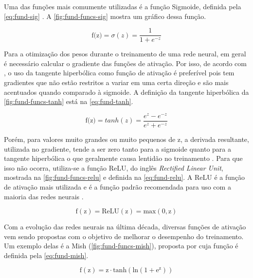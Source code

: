 Uma das funções mais comumente utilizadas é a função Sigmoide, definida pela \autoref{eq:fund-sig} \cite{ref:Sharma}. A \autoref{fig:fund-funcs-sig} mostra um gráfico dessa função.

\begin{equation} \label{eq:fund-sig}
  \text{f(z)} = \sigma(z) = \frac{1}{1 + e^{-z}}
\end{equation}

Para a otimização dos pesos durante o treinamento de uma rede neural, em geral é necessário calcular o gradiente das funções de ativação. Por isso, de acordo com , o uso da tangente hiperbólica como função de ativação é preferível pois tem gradientes que não estão restritos a variar em uma certa direção e são mais acentuados quando comparado à sigmoide. A definição da tangente hiperbólica da \autoref{fig:fund-funcs-tanh} está na \autoref{eq:fund-tanh}.

\begin{equation} \label{eq:fund-tanh}
  \text{f(z)} = tanh(z) = \frac{e^{z} - e^{-z}}{e^{z} + e^{-z}}
\end{equation}

Porém, para valores muito grandes ou muito pequenos de $\mathrm{z}$, a derivada resultante, utilizada no gradiente, tende a ser zero tanto para a sigmoide quanto para a tangente hiperbólica \cite{ref:Ng} o que geralmente causa lentidão no treinamento \cite{ref:Misra}. Para que isso não ocorra, utiliza-se a função ReLU, do inglês \textit{Rectified Linear Unit}, mostrada na \autoref{fig:fund-funcs-relu} e definida na \autoref{eq:fund-relu}. A ReLU é a função de ativação mais utilizada \cite{ref:Ng} e é a função padrão recomendada para uso com a maioria das redes neurais \cite{ref:Goodfellow-Bengio-Courville}.

\begin{equation} \label{eq:fund-relu}
  \mathrm{{f(z)} = ReLU(z) = max(0, z)}
\end{equation}

Com a evolução das redes neurais na última década, diversas funções de ativação vem sendo propostas com o objetivo de melhorar o desempenho do treinamento. Um exemplo delas é a Mish (\autoref{fig:fund-funcs-mish}), proposta por  cuja função é definida pela \autoref{eq:fund-mish}.

\begin{equation} \label{eq:fund-mish}
  \mathrm{{f(z)} = z \cdot tanh(ln(1 + e^z))}
\end{equation}

